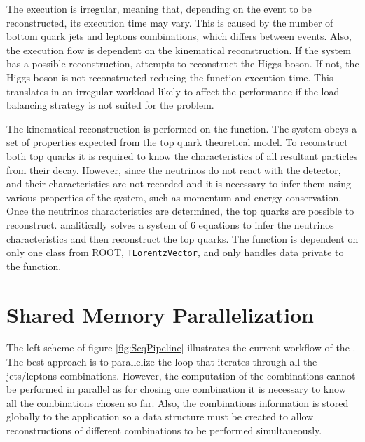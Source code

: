 The \ttDilepKinFit execution is irregular, meaning that, depending on the event to be reconstructed, its execution time may vary. This is caused by the number of bottom quark jets and leptons combinations, which differs between events. Also, the execution flow is dependent on the kinematical reconstruction. If the \ttbar system has a possible reconstruction, \ttDilepKinFit attempts to reconstruct the Higgs boson. If not, the Higgs boson is not reconstructed reducing the function execution time. This translates in an irregular workload likely to affect the performance if the load balancing strategy is not suited for the problem.

The kinematical reconstruction is performed on the \dilep function. The \ttbar system obeys a set of properties expected from the top quark theoretical model. To reconstruct both top quarks it is required to know the characteristics of all resultant particles from their decay. However, since the neutrinos do not react with the detector, and their characteristics are not recorded and it is necessary to infer them using various properties of the system, such as momentum and energy conservation. Once the neutrinos characteristics are determined, the top quarks are possible to reconstruct. \dilep analitically solves a system of 6 equations to infer the neutrinos characteristics and then reconstruct the top quarks. The function is dependent on only one class from ROOT, \texttt{TLorentzVector}, and only handles data private to the function.

\section{Shared Memory Parallelization}
\label{Parallelization:SharedMem}

The left scheme of figure \ref{fig:SeqPipeline} illustrates the current workflow of the \ttDilepKinFit. The best approach is to parallelize the loop that iterates through all the jets/leptons combinations. However, the computation of the combinations cannot be performed in parallel as for chosing one combination it is necessary to know all the combinations chosen so far. Also, the combinations information is stored globally to the application so a data structure must be created to allow reconstructions of different combinations to be performed simultaneously.

